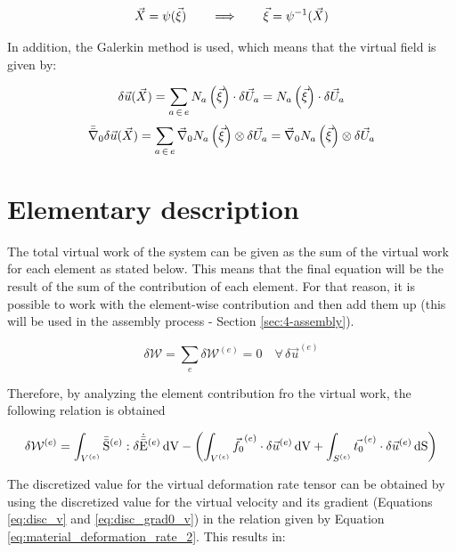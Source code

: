 \begin{equation} \label{eq:elem_transf}
    \vec{X} = \psi (\vec{\xi}) \qquad \Longrightarrow \qquad \vec{\xi} = \psi^{-1} (\vec{X})
\end{equation}

In addition, the Galerkin method is used, which means that the virtual field is given by:

\begin{equation} \label{eq:disc_v}
    \delta \vec{u} ( \vec{X} ) = \sum_{a \, \in \, e} N_a \left(\vec{\xi} \right) \cdot \delta \vec{U}_a = N_a \left(\vec{\xi} \right) \cdot \delta \vec{U}_a
\end{equation}
\begin{equation} \label{eq:disc_grad0_v}
    \bar{\bar{\nabla}}_\mathrm{0} \delta \vec{u}( \vec{X} ) = \sum_{a \, \in \, e} \vec{\nabla}_\mathrm{0} N_a \left(\vec{\xi} \right) \otimes \delta \vec{U}_a = \vec{\nabla}_\mathrm{0} N_a \left(\vec{\xi} \right) \otimes \delta \vec{U}_a
\end{equation}

\section{Elementary description}

The total virtual work of the system can be given as the sum of the virtual work for each element as stated below. This means that the final equation will be the result of the sum of the contribution of each element. For that reason, it is possible to work with the element-wise contribution and then add them up (this will be used in the assembly process - Section \ref{sec:4-assembly}).

\begin{equation}
    \delta \mathcal{W} = \sum_e \delta \mathcal{W}^{(e)} = 0 \quad \forall \, \delta \vec{u}^{(e)}
\end{equation}

Therefore, by analyzing the element contribution fro the virtual work, the following relation is obtained

\begin{equation*}
    \delta \mathcal{W}^{(e)} = \int_{V^{(e)}} \bar{\bar{\mathrm{S}}}^{(e)} : \delta\dot{\bar{\bar{\mathrm{E}}}}^{(e)} \, \mathrm{dV} - \left( \int_{V^{(e)}} \vec{f_0}^{(e)} \cdot \delta \vec{u}^{(e)} \, \mathrm{dV} + \int_{S^{(e)}} \vec{t_0}^{(e)} \cdot \delta \vec{u}^{(e)} \, \mathrm{dS} \right)
\end{equation*}

The discretized value for the virtual deformation rate tensor can be obtained by using the discretized value for the virtual velocity and its gradient (Equations \ref{eq:disc_v} and \ref{eq:disc_grad0_v}) in the relation given by Equation \ref{eq:material_deformation_rate_2}. This results in:

